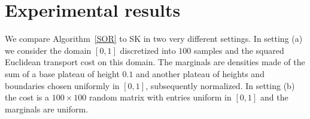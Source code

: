 \documentclass{article} %
\DeclareMathOperator{\diag}{diag}
\renewcommand{\epsilon}{\varepsilon}
\theoremstyle{plain}
\theoremstyle{definition}
\theoremstyle{remark}
\begin{document}

    

\section{Experimental results}
We compare Algorithm~\ref{SOR} to SK in two very different settings. In setting (a) we consider the domain $[0,1]$ discretized into $100$ samples and the squared Euclidean transport cost on this domain. The marginals are densities made of the sum of a base plateau of height $0.1$ and another plateau of heights and boundaries chosen uniformly in $[0,1]$, subsequently normalized. In setting (b) the cost is a $100\times 100$ random matrix with entries uniform in $[0,1]$ and the marginals are uniform.%
\end{document}
